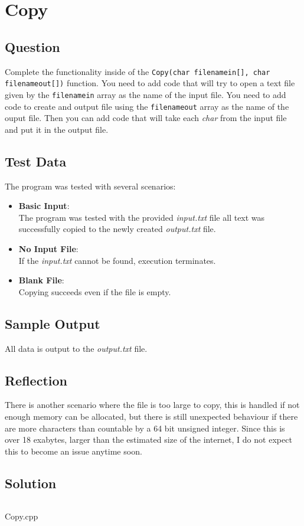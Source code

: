 \documentclass[Lab-C.tex]{subfiles}
\begin{document}
    \section{Copy}
        \subsection{Question}
        Complete the functionality inside of the \texttt{Copy(char filenamein[], char filenameout[])} function. 
        You need to add code that will try to open a text file given by the \texttt{filenamein} array as the name of the input file. 
        You need to add code to create and output file using the \texttt{filenameout} array as the name of the ouput file. 
        Then you can add code that will take each \textit{char} from the input file and put it in the output file.
            
        \subsection{Test Data}
            The program was tested with several scenarios:
            \begin{itemize}
                \item \textbf{Basic Input}:\\
                    The program was tested with the provided \textit{input.txt} file
                    all text was successfully copied to the newly created \textit{output.txt} file.
                
                \item \textbf{No Input File}:\\
                    If the \textit{input.txt} cannot be found, execution terminates.
                    
                \item \textbf{Blank File}:\\
                    Copying succeeds even if the file is empty.
            \end{itemize}
        
        \subsection{Sample Output}
            All data is output to the \textit{output.txt} file.

        \subsection{Reflection}
            There is another scenario where the file is too large to copy, this is handled
            if not enough memory can be allocated, but there is still unexpected behaviour if there are
            more characters than countable by a 64 bit unsigned integer. Since this is over
            18 exabytes, larger than the estimated size of the internet, 
            I do not expect this to become an issue anytime soon.

        \subsection{Solution}
            \begin{listing}[H]
                \inputminted[firstline=5, lastline=45]{cpp}{../Tasks/02-Copy/Copy.cpp}%
                \caption{Copy.cpp}
            \end{listing}
\end{document}
